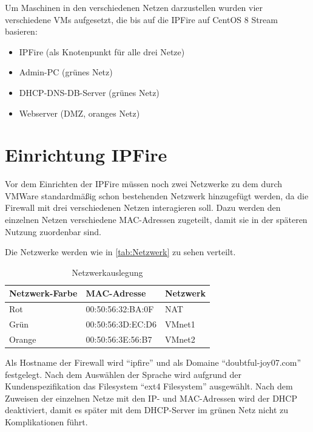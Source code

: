 \documentclass[a4paper,
    11pt,
    headings=small,
    ngerman,
    listof=totoc,
    numbers=noenddot]{scrreprt}[2021/11/13]
\begin{document}
Um Maschinen in den verschiedenen Netzen darzustellen wurden vier verschiedene \acp{VM} aufgesetzt, die bis auf die IPFire auf CentOS 8 Stream basieren:

\begin{itemize}
  \item IPFire (als Knotenpunkt für alle drei Netze)
  \item Admin-PC (grünes Netz)
  \item \acs{DHCP}-\acs{DNS}-\acs{DB}-Server (grünes Netz)
  \item Webserver (\ac{DMZ}, oranges Netz)
\end{itemize}



\section{Einrichtung IPFire}

Vor dem Einrichten der IPFire müssen noch zwei Netzwerke zu dem durch VMWare standardmäßig schon bestehenden Netzwerk hinzugefügt werden, da die Firewall mit drei verschiedenen Netzen interagieren soll. Dazu werden den einzelnen Netzen verschiedene MAC-Adressen zugeteilt, damit sie in der späteren Nutzung zuordenbar sind.

Die Netzwerke werden wie in \vref{tab:Netzwerk} zu sehen verteilt.

\begin{table}[htbp]
  \centering
  \renewcommand{\arraystretch}{1.25}
  \caption{Netzwerkauslegung}
  \begin{tabular}{lll}
    Netzwerk-Farbe & MAC-Adresse       & Netzwerk \\
    \hline
    Rot            & 00:50:56:32:BA:0F & NAT      \\
    Grün           & 00:50:56:3D:EC:D6 & VMnet1   \\
    Orange         & 00:50:56:3E:56:B7 & VMnet2   \\
  \end{tabular}
  \label{tab:Netzwerk}
\end{table}

Als Hostname der Firewall wird \enquote{ipfire} und als Domaine \enquote{doubtful-joy07.com} festgelegt.
Nach dem Auswählen der Sprache wird aufgrund der Kundenspezifikation das Filesystem \enquote{ext4 Filesystem} ausgewählt. Nach dem Zuweisen der einzelnen Netze mit den IP- und MAC-Adressen wird der \ac{DHCP} deaktiviert, damit es später mit dem \ac{DHCP}-Server im grünen Netz nicht zu Komplikationen führt.
\end{document}
